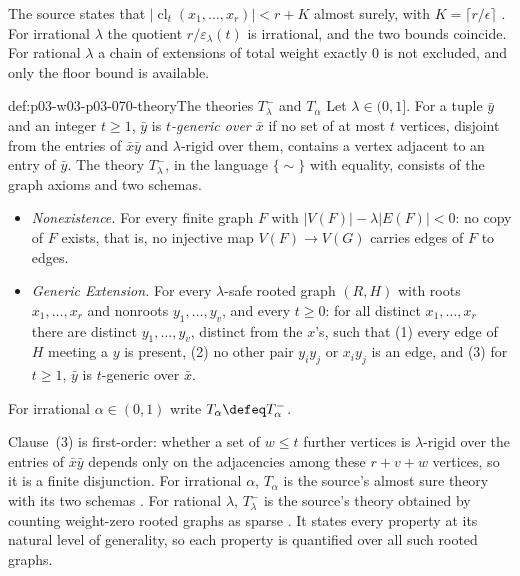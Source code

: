 The source states that \(|\operatorname{cl}_t(x_1,\ldots,x_r)|<r+K\) almost
surely, with \(K=\lceil r/\epsilon\rceil\)
\cite[p.~9]{Spencer2007LogicRandomStructuresAuthor}.  For irrational
\(\lambda\) the quotient \(r/\varepsilon_\lambda(t)\) is irrational, and the
two bounds coincide.  For rational \(\lambda\) a chain of extensions of total
weight exactly \(0\) is not excluded, and only the floor bound is available.

\begin{hbdefinition}{def:p03-w03-p03-070-theory}{The theories \(T^-_\lambda\) and \(T_\alpha\)}
Let \(\lambda\in(0,1]\).  For a tuple \(\bar y\) and an integer \(t\geq1\),
\(\bar y\) is \emph{\(t\)-generic over \(\bar x\)} if no set of at most \(t\)
vertices, disjoint from the entries of \(\bar x\bar y\) and
\(\lambda\)-rigid over them, contains a vertex adjacent to an entry of
\(\bar y\).  The theory \(T^-_\lambda\), in the language \(\{\sim\}\) with
equality, consists of the graph axioms and two schemas.
\begin{itemize}
\item \emph{Nonexistence.}  For every finite graph \(F\) with
      \(|V(F)|-\lambda|E(F)|<0\): no copy of \(F\) exists, that is, no
      injective map \(V(F)\to V(G)\) carries edges of \(F\) to edges.
\item \emph{Generic Extension.}  For every \(\lambda\)-safe rooted graph
      \((R,H)\) with roots \(x_1,\ldots,x_r\) and nonroots
      \(y_1,\ldots,y_v\), and every \(t\geq0\): for all distinct
      \(x_1,\ldots,x_r\) there are distinct \(y_1,\ldots,y_v\), distinct from
      the \(x\)'s, such that (1) every edge of \(H\) meeting a \(y\) is
      present, (2) no other pair \(y_iy_j\) or \(x_iy_j\) is an edge, and
      (3) for \(t\geq1\), \(\bar y\) is \(t\)-generic over \(\bar x\).
\end{itemize}
For irrational \(\alpha\in(0,1)\) write \(T_\alpha\defeq T^-_\alpha\).
\end{hbdefinition}

Clause~(3) is first-order: whether a set of \(w\leq t\) further vertices is
\(\lambda\)-rigid over the entries of \(\bar x\bar y\) depends only on the
adjacencies among these \(r+v+w\) vertices, so it is a finite disjunction.
For irrational \(\alpha\), \(T_\alpha\) is the source's almost sure theory
with its two schemas \cite[p.~10]{Spencer2007LogicRandomStructuresAuthor}.
For rational \(\lambda\), \(T^-_\lambda\) is the source's theory obtained by
counting weight-zero rooted graphs as sparse
\cite[p.~19]{Spencer2007LogicRandomStructuresAuthor}.  It states every
property at its natural level of generality, so each property is quantified
over all such rooted graphs.

